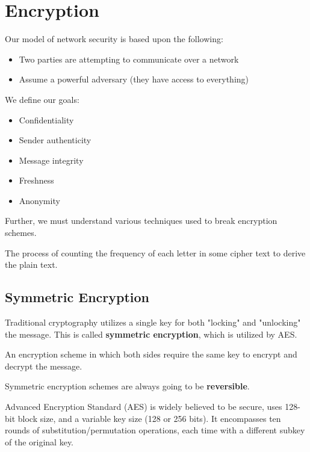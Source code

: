 \section{Encryption}
Our model of network security is based upon the following:
\begin{itemize}
	\item Two parties are attempting to communicate over a network
	\item Assume a powerful adversary (they have access to everything)
\end{itemize}

We define our goals:
\begin{itemize}
	\item Confidentiality
	\item Sender authenticity
	\item Message integrity
	\item Freshness
	\item Anonymity
\end{itemize}

Further, we must understand various techniques used to break encryption schemes.

\begin{definition}
	The process of counting the frequency of each letter in some cipher text to derive the plain text.
\end{definition}

\subsection{Symmetric Encryption}
Traditional cryptography utilizes a single key for both "locking" and "unlocking" the message. This is called \textbf{symmetric encryption}, which is utilized by AES.

\begin{definition}
	An encryption scheme in which both sides require the same key to encrypt and decrypt the message.
\end{definition}
\begin{remark}
	Symmetric encryption schemes are always going to be \textbf{reversible}.
\end{remark}

\begin{definition}
	Advanced Encryption Standard (AES) is widely believed to be secure, uses 128-bit block size, and a variable key size (128 or 256 bits). It encompasses ten rounds of substitution/permutation operations, each time with a different subkey of the original key.
\end{definition}

